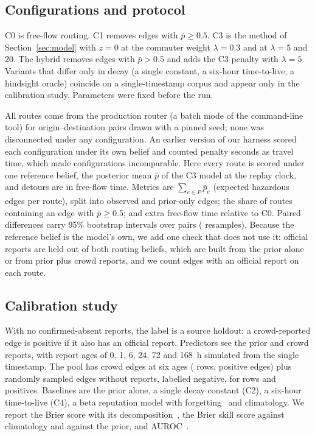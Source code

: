 \documentclass[conference]{IEEEtran}
\begin{document}
\subsection{Configurations and protocol}
C0 is free-flow routing. C1 removes edges with $\bar p\ge0.5$. C3 is the method of Section~\ref{sec:model} with $z=0$ at the commuter weight $\lambda=0.3$ and at $\lambda=5$ and 20. The hybrid removes edges with $\bar p>0.5$ and adds the C3 penalty with $\lambda=5$. Variants that differ only in decay (a single constant, a six-hour time-to-live, a hindsight oracle) coincide on a single-timestamp corpus and appear only in the calibration study. Parameters were fixed before the run.

All routes come from the production router (a batch mode of the command-line tool) for \NOD{} origin--destination pairs drawn with a pinned seed; none was disconnected under any configuration. An earlier version of our harness scored each configuration under its own belief and counted penalty seconds as travel time, which made configurations incomparable. Here every route is scored under one reference belief, the posterior mean $\bar p$ of the C3 model at the replay clock, and detours are in free-flow time. Metrics are $\sum_{e\in P}\bar p_e$ (expected hazardous edges per route), split into observed and prior-only edges; the share of routes containing an edge with $\bar p\ge0.5$; and extra free-flow time relative to C0. Paired differences carry 95\% bootstrap intervals over pairs (\BootB{} resamples). Because the reference belief is the model's own, we add one check that does not use it: official reports are held out of both routing beliefs, which are built from the prior alone or from prior plus crowd reports, and we count edges with an official report on each route.

\subsection{Calibration study}
With no confirmed-absent reports, the label is a source holdout: a crowd-reported edge is positive if it also has an official report. Predictors see the prior and crowd reports, with report ages of 0, 1, 6, 24, 72 and 168~h simulated from the single timestamp. The pool has \CrowdEdges{} crowd edges at six ages (\CrowdRows{} rows, \PosEdges{} positive edges) plus \NoRepEdges{} randomly sampled edges without reports, labelled negative, for \CalN{} rows and \CalPos{} positives. Baselines are the prior alone, a single decay constant (C2), a six-hour time-to-live (C4), a beta reputation model with forgetting~\cite{josang2002beta} and climatology. We report the Brier score with its decomposition~\cite{brier1950verification,murphy1973partition}, the Brier skill score against climatology and against the prior, and AUROC~\cite{fawcett2006roc}.
\end{document}
